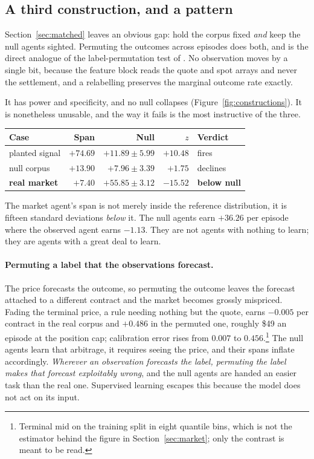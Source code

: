 \documentclass[10pt,twocolumn]{article}
\begin{document}
\subsection{A third construction, and a pattern}
\label{sec:permuted}

Section~\ref{sec:matched} leaves an obvious gap: hold the corpus fixed
\emph{and} keep the null agents sighted. Permuting the outcomes across episodes
does both, and is the direct analogue of the label-permutation test of
\citet{adebayo2018sanity}. No observation moves by a single bit, because the
feature block reads the quote and spot arrays and never the settlement, and a
relabelling preserves the marginal outcome rate exactly.

It has power and specificity, and no null collapses
(Figure~\ref{fig:constructions}). It is nonetheless unusable, and the way it
fails is the most instructive of the three.

\begin{center}\footnotesize
\begin{tabular}{lrrrl}
\toprule
Case & Span & Null & $z$ & Verdict \\
\midrule
planted signal & $+74.69$ & $+11.89 \pm 5.99$ & $+10.48$ & fires \\
null corpus & $+13.90$ & $+7.96 \pm 3.39$ & $+1.75$ & declines \\
\textbf{real market} & $\mathbf{+7.40}$ & $\mathbf{+55.85 \pm 3.12}$ &
$\mathbf{-15.52}$ & \textbf{below null} \\
\bottomrule
\end{tabular}
\end{center}

The market agent's span is not merely inside the reference distribution, it is
fifteen standard deviations \emph{below} it. The null agents earn $+36.26$ per
episode where the observed agent earns $-1.13$. They are not agents with nothing
to learn; they are agents with a great deal to learn.

\paragraph{Permuting a label that the observations forecast.}
The price forecasts the outcome, so permuting the outcome leaves the forecast
attached to a different contract and the market becomes grossly mispriced.
Fading the terminal price, a rule needing nothing but the quote, earns $-0.005$
per contract in the real corpus and $+0.486$ in the permuted one, roughly \$49
an episode at the position cap; calibration error rises from $0.007$ to
$0.456$.\footnote{Terminal mid on the training split in eight quantile bins,
which is not the estimator behind the figure in Section~\ref{sec:market}; only
the contrast is meant to be read.} The null agents learn that arbitrage, it
requires seeing the price, and their spans inflate accordingly. \emph{Wherever
an observation forecasts the label, permuting the label makes that forecast
exploitably wrong}, and the null agents are handed an easier task than the real
one. Supervised learning escapes this because the model does not act on its
input.
\end{document}
